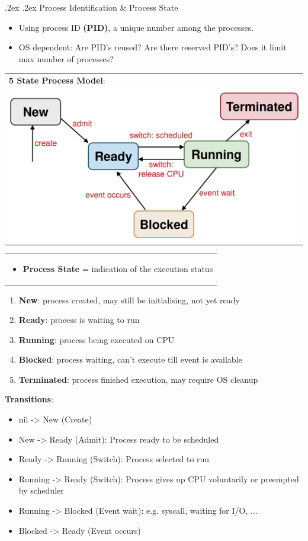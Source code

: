 \documentclass[10pt,landscape,a4paper]{article}
\makeatletter
\renewcommand{\subsection}{\@startsection{subsection}{1}{0mm}%
  {.2ex}%
  {.2ex}%
{\sffamily\bfseries}}
\makeatother
\begin{document}
\begin{multicols*}{4}
  \subsection{Process Identification \& Process State}
  \begin{itemize}
    \item Using process ID \textbf{(PID)}, a unique number among the processes.
    \item OS dependent: Are PID's reused? Are there reserved PID's? Does it limit max number of processes?
  \end{itemize}
  \begin{tabular}{l}
    \textbf{5 State Process Model}:\\
    \includegraphics[width=0.55\linewidth]{process-state}
  \end{tabular}
  \begin{tabularx}{0.4\columnwidth}{X}
  \begin{itemize}
    \item \textbf{Process State} = indication of the execution status
  \end{itemize}
  \end{tabularx}
  \begin{enumerate}
    \item \textbf{New}: process created, may still be initialising, not yet ready
    \item \textbf{Ready}: process is waiting to run
    \item \textbf{Running}: process being executed on CPU
    \item \textbf{Blocked}: process waiting, can't execute till event is available
    \item \textbf{Terminated}: process finished execution, may require OS cleanup
  \end{enumerate}
  \textbf{Transitions}:
  \begin{itemize}
    \item nil -> New (Create)
    \item New -> Ready (Admit): Process ready to be scheduled
    \item Ready -> Running (Switch): Process selected to run
    \item Running -> Ready (Switch): Process gives up CPU voluntarily or preempted by scheduler
    \item Running -> Blocked (Event wait): e.g. syscall, waiting for I/O, ...
    \item Blocked -> Ready (Event occurs)
  \end{itemize}

\end{multicols*}
\end{document}
